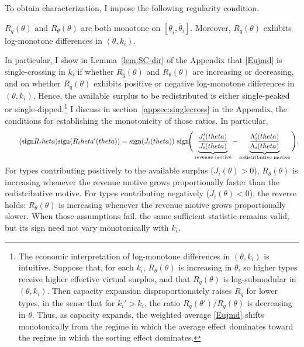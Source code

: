 \documentclass{class}
\begin{document}
To obtain characterization, I impose the following regularity condition.

\renewcommand{\theassumption}{Monot.}
\begin{assumption}\label{ass:monotone}
\(R_q(\theta)\) and \(R_\theta(\theta)\) are both monotone on \([\underline{\theta}_i,\overline{\theta}_i]\). Moreover, \(R_q(\theta)\) exhibits log-monotone differences in \((\theta,k_i)\).
\end{assumption}
\renewcommand{\theassumption}{\arabic{assumption}}

In particular, I show in Lemma~\ref{lem:SC-dir} of the Appendix that \ref{Eujmd} is single-crossing in \(k_i\) if whether \(R_q(\theta)\) and \(R_\theta(\theta)\) are increasing or decreasing, and on whether \(R_q(\theta)\) exhibits positive or negative log-monotone differences in \((\theta,k_i)\). Hence, the available surplus to be redistributed is either single-peaked or single-dipped.\footnote{The economic interpretation of log-monotone differences in \((\theta,k_i)\) is intuitive. Suppose that, for each \(k_i\), $R_\theta(\theta)$ is increasing in $\theta$, so higher types receive higher effective virtual surplus, and that \(R_q(\theta)\) is log-submodular in \((\theta,k_i)\). Then capacity expansion disproportionately raises \(R_q\) for lower types, in the sense that for \(k_i'>k_i\), the ratio \(R_q(\theta')/R_q(\theta)\) is decreasing in \(\theta\). Thus, as capacity expands, the weighted average \ref{Eujmd} shifts monotonically from the regime in which the average effect dominates toward the regime in which the sorting effect dominates.} I discuss in section~\ref{appsec:singlecross} in the Appendix, the conditions for establishing the monotonicity of those ratios. In particular, 
\[
\label{signRt}\tag{$\sign R_\theta$} \sign\!\left(R_\theta'(\theta)\right) = \sign\!\left(J_i(\theta)\right)\,\sign\!\Bigg(\underbrace{\frac{J_i'(\theta)}{J_i(\theta)}}_{\text{revenue motive}} - \underbrace{\frac{\Lambda_i'(\theta)}{\Lambda_i(\theta)}}_{\text{redistributive motive}}\Bigg).
\] For types contributing positively to the available surplus ($J_i(\theta) > 0$), $R_\theta(\theta)$ is increasing whenever the revenue motive grows proportionally faster than the redistributive motive. For types contributing negatively ($J_i(\theta) < 0$), the reverse holds: $R_\theta(\theta)$ is increasing whenever the revenue motive grows proportionally slower. When those assumptions fail, the same sufficient statistic remains valid, but its sign need not vary monotonically with \(k_i\).
\end{document}
